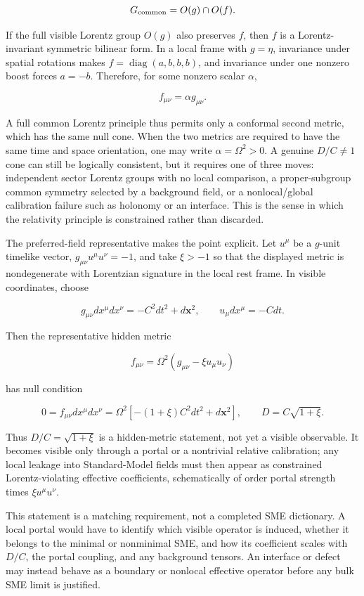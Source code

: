 \documentclass[11pt]{article}
\begin{document}
\[
G_{\rm common}=O(g)\cap O(f).
\]


If the full visible Lorentz group \(O(g)\) also preserves \(f\), then \(f\) is a Lorentz-invariant symmetric bilinear form. In a local frame with \(g=\eta\), invariance under spatial rotations makes \(f=\operatorname{diag}(a,b,b,b)\), and invariance under one nonzero boost forces \(a=-b\). Therefore, for some nonzero scalar \(\alpha\),


\[
f_{\mu\nu}=\alpha g_{\mu\nu}.
\]


A full common Lorentz principle thus permits only a conformal second metric, which has the same null cone. When the two metrics are required to have the same time and space orientation, one may write \(\alpha=\Omega^2>0\). A genuine \(D/C\neq1\) cone can still be logically consistent, but it requires one of three moves: independent sector Lorentz groups with no local comparison, a proper-subgroup common symmetry selected by a background field, or a nonlocal/global calibration failure such as holonomy or an interface. This is the sense in which the relativity principle is constrained rather than discarded.


The preferred-field representative makes the point explicit. Let \(u^\mu\) be a \(g\)-unit timelike vector, \(g_{\mu\nu}u^\mu u^\nu=-1\), and take \(\xi>-1\) so that the displayed metric is nondegenerate with Lorentzian signature in the local rest frame. In visible coordinates, choose


\[
g_{\mu\nu}dx^\mu dx^\nu=-C^2dt^2+d\mathbf{x}^2,
\qquad
u_\mu dx^\mu=-Cdt .
\]


Then the representative hidden metric


\[
f_{\mu\nu}=\Omega^2(g_{\mu\nu}-\xi u_\mu u_\nu)
\]


has null condition


\[
0=f_{\mu\nu}dx^\mu dx^\nu
=\Omega^2[-(1+\xi)C^2dt^2+d\mathbf{x}^2],
\qquad
D=C\sqrt{1+\xi}.
\]


Thus \(D/C=\sqrt{1+\xi}\) is a hidden-metric statement, not yet a visible observable. It becomes visible only through a portal or a nontrivial relative calibration; any local leakage into Standard-Model fields must then appear as constrained Lorentz-violating effective coefficients, schematically of order portal strength times \(\xi u^\mu u^\nu\).


This statement is a matching requirement, not a completed SME dictionary. A local portal would have to identify which visible operator is induced, whether it belongs to the minimal or nonminimal SME, and how its coefficient scales with \(D/C\), the portal coupling, and any background tensors. An interface or defect may instead behave as a boundary or nonlocal effective operator before any bulk SME limit is justified.
\end{document}
